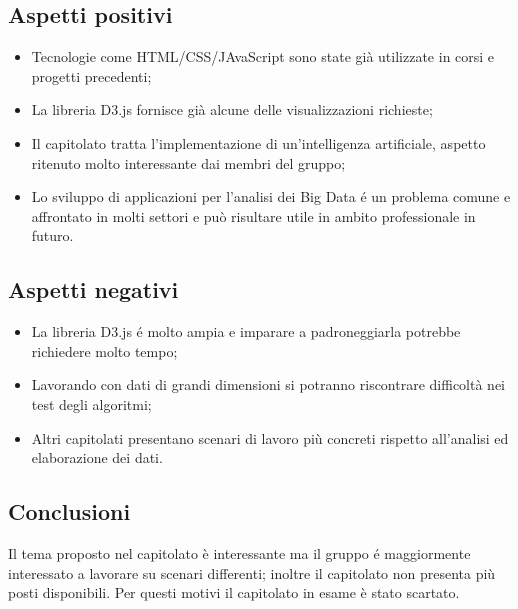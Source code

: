 \subsection{Aspetti positivi}
\begin{itemize}
\item Tecnologie come HTML/CSS/JAvaScript sono state già utilizzate in corsi e progetti precedenti;
\item La libreria D3.js fornisce già alcune delle visualizzazioni richieste;
\item Il capitolato tratta l'implementazione di un'intelligenza artificiale, aspetto ritenuto molto interessante dai membri del gruppo;
\item Lo sviluppo di applicazioni per l'analisi dei Big Data é un problema comune e affrontato in molti settori e può risultare utile in ambito professionale in futuro.
\end{itemize}

\subsection{Aspetti negativi}
\begin{itemize}
\item La libreria D3.js é molto ampia e imparare a padroneggiarla potrebbe richiedere molto tempo;
\item Lavorando con dati di grandi dimensioni si potranno riscontrare difficoltà nei test degli algoritmi;
\item Altri capitolati presentano scenari di lavoro più concreti rispetto all'analisi ed elaborazione dei dati.
\end{itemize}


\subsection{Conclusioni}
Il tema proposto nel capitolato è interessante ma il gruppo é maggiormente interessato a lavorare su scenari differenti; 
inoltre il capitolato non presenta più posti disponibili. Per questi motivi il capitolato in esame è stato scartato.